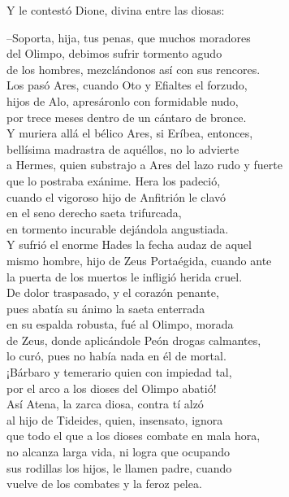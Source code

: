 Y le contestó Dione, divina entre las diosas:\par
--Soporta, hija, tus penas, que muchos moradores\\
del Olimpo, debimos sufrir tormento agudo\\
de los hombres, mezclándonos así con sus rencores.\\
Los pasó Ares, cuando Oto y Efialtes el forzudo,\\
hijos de Alo, apresáronlo con formidable nudo,\\
por trece meses dentro de un cántaro de bronce.\\
Y muriera allá el bélico Ares, si Eríbea, entonces,\\
bellísima madrastra de aquéllos, no lo advierte\\
a Hermes, quien substrajo a Ares del lazo rudo y fuerte\\
que lo postraba exánime. Hera los padeció,\\
cuando el vigoroso hijo de Anfitrión le clavó\\
en el seno derecho saeta trifurcada,\\
en tormento incurable dejándola angustiada.\\
Y sufrió el enorme Hades la fecha audaz de aquel\\
mismo hombre, hijo de Zeus Portaégida, cuando ante\\
la puerta de los muertos le infligió herida cruel.\\
De dolor traspasado, y el corazón penante,\\
pues abatía su ánimo la saeta enterrada\\
en su espalda robusta, fué al Olimpo, morada\\
de Zeus, donde aplicándole Peón drogas calmantes,\\
lo curó, pues no había nada en él de mortal.\\
¡Bárbaro y temerario quien con impiedad tal,\\
por el arco a los dioses del Olimpo abatió!\\
Así Atena, la zarca diosa, contra tí alzó\\
al hijo de Tideides, quien, insensato, ignora\\
que todo el que a los dioses combate en mala hora,\\
no alcanza larga vida, ni logra que ocupando\\
sus rodillas los hijos, le llamen padre, cuando\\
vuelve de los combates y la feroz pelea.\\
